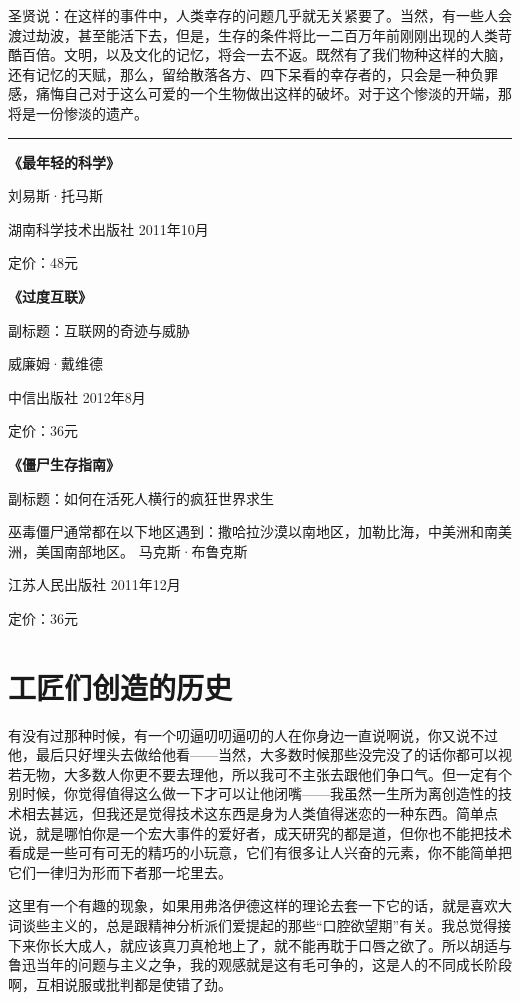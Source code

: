 圣贤说：在这样的事件中，人类幸存的问题几乎就无关紧要了。当然，有一些人会渡过劫波，甚至能活下去，但是，生存的条件将比一二百万年前刚刚出现的人类苛酷百倍。文明，以及文化的记忆，将会一去不返。既然有了我们物种这样的大脑，还有记忆的天赋，那么，留给散落各方、四下呆看的幸存者的，只会是一种负罪感，痛悔自己对于这么可爱的一个生物做出这样的破坏。对于这个惨淡的开端，那将是一份惨淡的遗产。

\begin{center}\rule{3in}{0.4pt}\end{center}

\textbf{《最年轻的科学》}

刘易斯·托马斯

湖南科学技术出版社 2011年10月

定价：48元

\textbf{《过度互联》}

副标题：互联网的奇迹与威胁

威廉姆·戴维德

中信出版社 2012年8月

定价：36元

\textbf{《僵尸生存指南》}

副标题：如何在活死人横行的疯狂世界求生

巫毒僵尸通常都在以下地区遇到：撒哈拉沙漠以南地区，加勒比海，中美洲和南美洲，美国南部地区。
马克斯·布鲁克斯

江苏人民出版社 2011年12月

定价：36元

\section{工匠们创造的历史}

有没有过那种时候，有一个叨逼叨叨逼叨的人在你身边一直说啊说，你又说不过他，最后只好埋头去做给他看------当然，大多数时候那些没完没了的话你都可以视若无物，大多数人你更不要去理他，所以我可不主张去跟他们争口气。但一定有个别时候，你觉得值得这么做一下才可以让他闭嘴------我虽然一生所为离创造性的技术相去甚远，但我还是觉得技术这东西是身为人类值得迷恋的一种东西。简单点说，就是哪怕你是一个宏大事件的爱好者，成天研究的都是道，但你也不能把技术看成是一些可有可无的精巧的小玩意，它们有很多让人兴奋的元素，你不能简单把它们一律归为形而下者那一坨里去。

这里有一个有趣的现象，如果用弗洛伊德这样的理论去套一下它的话，就是喜欢大词谈些主义的，总是跟精神分析派们爱提起的那些``口腔欲望期''有关。我总觉得接下来你长大成人，就应该真刀真枪地上了，就不能再耽于口唇之欲了。所以胡适与鲁迅当年的问题与主义之争，我的观感就是这有毛可争的，这是人的不同成长阶段啊，互相说服或批判都是使错了劲。

